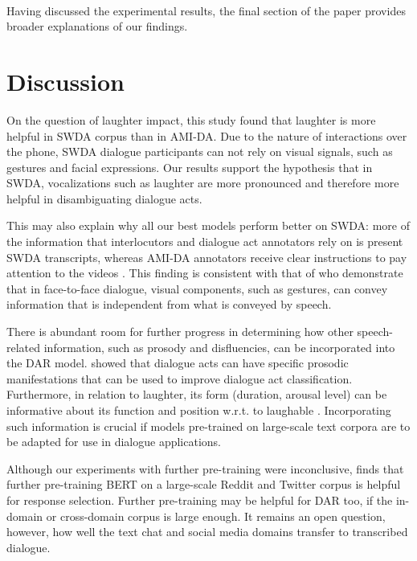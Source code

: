 \documentclass[11pt,a4paper]{article}
\begin{document}
\paragraph{}
Having discussed the experimental results, the final section of the paper provides broader explanations of our findings.

\section{Discussion} %
On the question of laughter impact, this study found that laughter is more helpful in SWDA corpus than in AMI-DA.
Due to the nature of interactions over the phone, SWDA dialogue participants can not rely on visual signals, such as gestures and facial expressions.
Our results support the hypothesis that in SWDA, vocalizations such as laughter are more pronounced and therefore more helpful in disambiguating dialogue acts.

This may also explain why all our best models perform better on SWDA: more of the information that interlocutors and dialogue act annotators rely on is present SWDA transcripts, whereas AMI-DA annotators receive clear instructions to pay attention to the videos \citep{GuidelinesDialogueAct2005}.
This finding is consistent with that of \citet{bavelas2008gesturing} who demonstrate that in face-to-face dialogue, visual components, such as gestures, can convey information that is independent from what is conveyed by speech.

There is abundant room for further progress in determining how other speech-related information, such as prosody and disfluencies, can be incorporated into the DAR model.
\citet{stolckeDialogueActModeling2000} showed that dialogue acts can have specific prosodic manifestations that can be used to improve dialogue act classification.
Furthermore, in relation to laughter, its form (duration, arousal level) can be informative about its function and position w.r.t. to laughable \citep{tian2016we,mazzocconi2019phd}.
Incorporating such information is crucial if models pre-trained on large-scale text corpora are to be adapted for use in dialogue applications.

Although our experiments with further pre-training were inconclusive, \citet{baoPLATOPretrainedDialogue2019} finds that further pre-training BERT on a large-scale Reddit and Twitter corpus is helpful for response selection.
Further pre-training may be helpful for DAR too, if the in-domain or cross-domain corpus is large enough.
It remains an open question, however, how well the text chat and social media domains transfer to transcribed dialogue.
\end{document}
